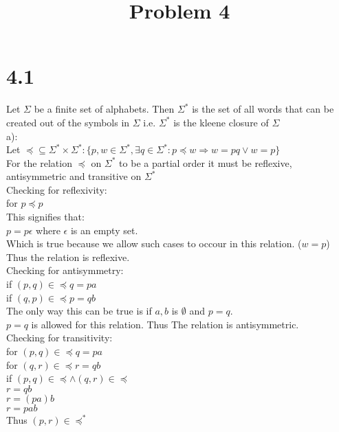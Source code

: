 \documentclass{article}
\begin{document}
    \title{\textbf{Problem 4}}
    \maketitle

    \section{4.1}

    Let $\Sigma$ be a finite set of alphabets. Then $\Sigma^*$ is the set of all words that can be created
    out of the symbols in $\Sigma$ i.e. $\Sigma^*$ is the kleene closure of $\Sigma$\\

    a):\\
    Let $\preceq \subseteq \Sigma^* \times \Sigma^* : \{p, w \in \Sigma^*, \exists q \in \Sigma^*: p \preceq w \Rightarrow  w = pq \lor w = p \}$\\
    For the relation $\preceq$ on $\Sigma^*$ to be a partial order it must be reflexive, antisymmetric and transitive on $\Sigma^*$\\

    Checking for reflexivity:\\
    for $p \preceq p$\\
    This signifies that:\\
    $p = p\epsilon$ where $\epsilon$ is an empty 	set.\\
    Which is true because we allow such cases to occour in this relation. ($w = p$)\\
    Thus the relation is reflexive.\\

    Checking for antisymmetry:\\
    if $(p, q) \in \preceq q = pa$\\
    if $(q, p) \in \preceq p = qb$\\

    The only way this can be true is if $a, b$ is $\emptyset$ and $p = q$.\\
    $p = q$ is allowed for this relation. Thus The relation is antisymmetric.\\

    Checking for transitivity:\\

    for $(p, q) \in \preceq q = pa$\\
    for $(q, r) \in \preceq r = qb$\\
    if $(p, q) \in \preceq \land (q, r) \in \preceq$\\
    $r = qb$\\
    $r = (pa)b$\\
    $r = pab$\\
    Thus $(p, r) \in \preceq^*$
\end{document}

